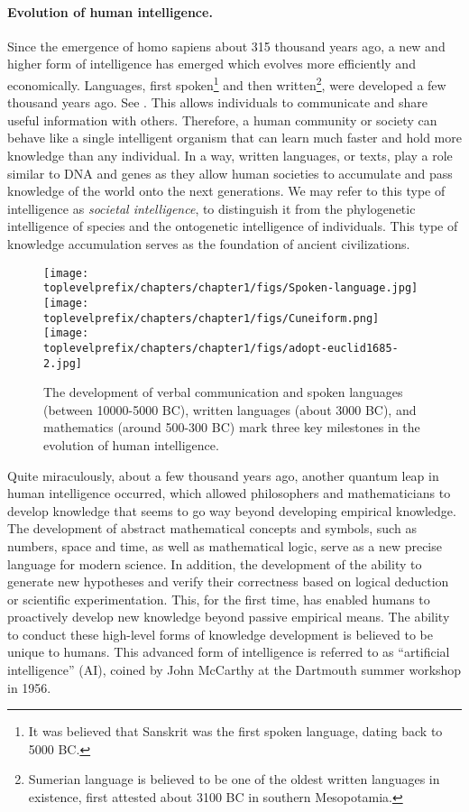 \documentclass[../../book-main.tex]{subfiles}
\begin{document}
\paragraph{Evolution of human intelligence.}
Since the emergence of homo sapiens about 315 thousand years ago, a new and higher form of intelligence has emerged which evolves more efficiently and economically. Languages, first spoken\footnote{It was believed that Sanskrit was the first spoken language, dating back to 5000 BC.} and then written\footnote{Sumerian language is believed to be one of the oldest written languages in existence, first attested about 3100 BC in southern Mesopotamia.}, were developed a few thousand years ago. See . This allows individuals to communicate and share useful information with others. Therefore, a human community or society can behave like a single intelligent organism that can learn much faster and hold more knowledge than any individual. In a way, written languages, or texts, play a role similar to DNA and genes as they allow human societies to accumulate and pass knowledge of the world onto the next generations. We may refer to this type of intelligence as {\em  societal intelligence}, to distinguish it from the phylogenetic intelligence of species and the ontogenetic intelligence of individuals. This type of knowledge accumulation serves as the foundation of ancient civilizations.
\begin{figure}
    \centering
    \texttt{[image: \\toplevelprefix/chapters/chapter1/figs/Spoken-language.jpg]}
   \hspace{5mm} \texttt{[image: \\toplevelprefix/chapters/chapter1/figs/Cuneiform.png]}
   \hspace{5mm} \texttt{[image: \\toplevelprefix/chapters/chapter1/figs/adopt-euclid1685-2.jpg]}
    \caption{The development of verbal communication and spoken languages (between 10000-5000 BC), written languages (about 3000 BC), and mathematics (around 500-300 BC) mark three key milestones in the evolution of human intelligence.}
    \label{fig:human-intelligence}
\end{figure}

Quite miraculously, about a few thousand years ago, another quantum leap in human intelligence occurred, which allowed philosophers and mathematicians to develop knowledge that seems to go way beyond developing empirical knowledge. The development of abstract mathematical concepts and symbols, such as numbers, space and time, as well as mathematical logic, serve as a new precise language for modern science. In addition, the development of the ability to generate new hypotheses and verify their correctness based on logical deduction or scientific experimentation. This, for the first time, has enabled humans to proactively develop new knowledge beyond passive empirical means. The ability to conduct these high-level forms of knowledge development is believed to be unique to humans. This advanced form of intelligence is referred to as ``artificial intelligence'' (AI), coined by John McCarthy at the Dartmouth summer workshop in 1956. 
\end{document}

